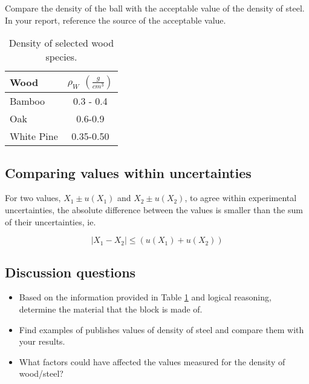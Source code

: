 Compare the density of the ball with the acceptable value of the density of steel. In your report, reference the source of the acceptable value. 

\begin{table}[ht]
    \centering
    \begin{tabular}{|l|c|}
    \hline
        \textbf{Wood} & $\rho_W$ $(\frac{g}{cm^3})$  \\
        \hline
         Bamboo& 0.3 - 0.4\\
         Oak& 0.6-0.9 \\
         White Pine& 0.35-0.50\\
         \hline
    \end{tabular}
    \caption{Density of selected wood species.}
    \label{table:wood}
\end{table}

\subsection{Comparing values within uncertainties}
For two values, $X_1 \pm u(X_1)$ and $X_2\pm u(X_2)$, to agree within experimental uncertainties, the absolute difference between the values is smaller than the sum of their uncertainties, ie.

\begin{equation}
\label{eq:unc_agreement}
|X_1-X_2|\leq(u(X_1)+u(X_2))
\end{equation}

\subsection{Discussion questions}
\begin{itemize}
\item
Based on the information provided in Table \ref{table:wood} and logical reasoning, determine the material that the block is made of. 
\item
Find examples of publishes values of density of steel and compare them with your results.
\item
What factors could have affected the values measured for the density of wood/steel?

\end{itemize}
